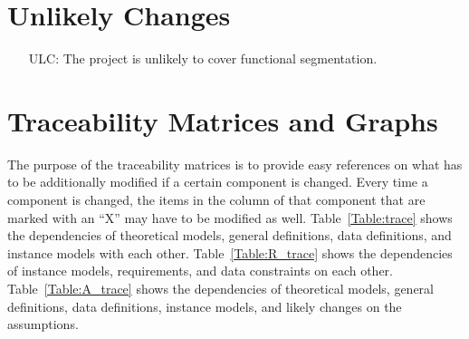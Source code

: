 \documentclass[12pt]{article}
\newcounter{lcnum} %
\begin{document}
\section{Unlikely Changes}

\noindent \begin{itemize}

  \item[ULC\refstepcounter{ulcnum}\thelcnum\label{ULC1}:] The project is unlikely to cover
        functional segmentation.

\end{itemize}

\section{Traceability Matrices and Graphs}

The purpose of the traceability matrices is to provide easy references on what
has to be additionally modified if a certain component is changed.  Every time a
component is changed, the items in the column of that component that are marked
with an ``X'' may have to be modified as well.  Table~\ref{Table:trace} shows the
dependencies of theoretical models, general definitions, data definitions, and
instance models with each other. Table~\ref{Table:R_trace} shows the
dependencies of instance models, requirements, and data constraints on each
other. Table~\ref{Table:A_trace} shows the dependencies of theoretical models,
general definitions, data definitions, instance models, and likely changes on
the assumptions.
\end{document}
